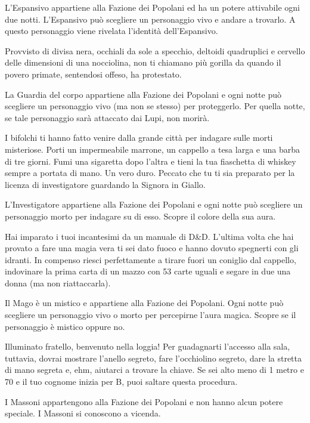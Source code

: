 {{{{{{{{{{{{{L'Espansivo appartiene alla Fazione dei Popolani ed ha un potere attivabile ogni due notti. L'Espansivo può scegliere un personaggio vivo e andare a trovarlo. A questo personaggio viene rivelata l'identità dell'Espansivo.
{%


{%
Provvisto di divisa nera, occhiali da sole a specchio, deltoidi quadruplici e cervello delle dimensioni di una nocciolina, non ti chiamano più gorilla da quando il povero primate, sentendosi offeso, ha protestato.

La Guardia del corpo appartiene alla Fazione dei Popolani e ogni notte può scegliere un personaggio vivo (ma non se stesso) per proteggerlo. Per quella notte, se tale personaggio sarà attaccato dai Lupi, non morirà.
{%


{%
I bifolchi ti hanno fatto venire dalla grande città per indagare sulle morti misteriose. Porti un impermeabile marrone, un cappello a tesa larga e una barba di tre giorni. Fumi una sigaretta dopo l'altra e tieni la tua fiaschetta di whiskey sempre a portata di mano. Un vero duro. Peccato che tu ti sia preparato per la licenza di investigatore guardando la Signora in Giallo.

L'Investigatore appartiene alla Fazione dei Popolani e ogni notte può scegliere un personaggio morto per indagare su di esso. Scopre il colore della sua aura.
{%


{%
Hai imparato i tuoi incantesimi da un manuale di D\&D. L'ultima volta che hai provato a fare una magia vera ti sei dato fuoco e hanno dovuto spegnerti con gli idranti. In compenso riesci perfettamente a tirare fuori un coniglio dal cappello, indovinare la prima carta di un mazzo con 53 carte uguali e segare in due una donna (ma non riattaccarla).

Il Mago è un mistico e appartiene alla Fazione dei Popolani. Ogni notte può scegliere un personaggio vivo o morto per percepirne l'aura magica. Scopre se il personaggio è mistico oppure no.
{%


{%
Illuminato fratello, benvenuto nella loggia! Per guadagnarti l'accesso alla sala, tuttavia, dovrai mostrare l'anello segreto, fare l'occhiolino segreto, dare la stretta di mano segreta e, ehm, aiutarci a trovare la chiave. Se sei alto meno di 1 metro e 70 e il tuo cognome inizia per B, puoi saltare questa procedura.

I Massoni appartengono alla Fazione dei Popolani e non hanno alcun potere speciale. I Massoni si conoscono a vicenda.
{%


}}}}}}}}}}}}}}}}}}}}}}
